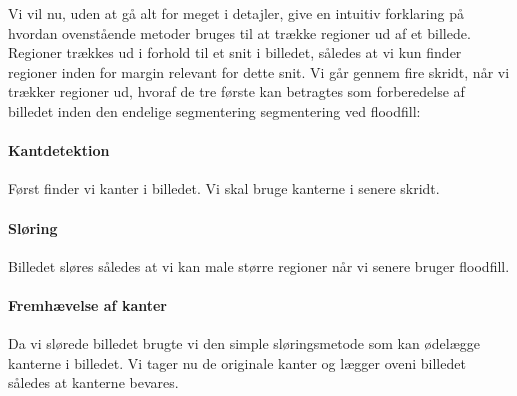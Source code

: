 {

Vi vil nu, uden at gå alt for meget i detajler, give en intuitiv
forklaring på hvordan ovenstående metoder bruges til at trække regioner
ud af et billede.  Regioner trækkes ud i forhold til et snit i billedet,
således at vi kun finder regioner inden for margin relevant for dette
snit. Vi går gennem fire skridt, når vi trækker regioner ud, hvoraf de
tre første kan betragtes som forberedelse af billedet inden den endelige
segmentering segmentering ved floodfill:

\paragraph{Kantdetektion}
Først finder vi kanter i billedet. Vi skal bruge kanterne i senere
skridt.

\begin{figure}[!h]
    \setlength\fboxsep{0pt}
    \setlength\fboxrule{0.5pt}
    \begin{center}
    \end{center}
    \caption[]{}
    \label{sammen_kanter}
\end{figure}

\paragraph{Sløring}
Billedet sløres således at vi kan male større regioner når vi senere
bruger floodfill.

\begin{figure}[!h]
    \setlength\fboxsep{0pt}
    \setlength\fboxrule{0.5pt}
    \begin{center}
    \end{center}
    \caption[]{}
    \label{sammen_slør}
\end{figure}

\paragraph{Fremhævelse af kanter}
Da vi slørede billedet brugte vi den simple sløringsmetode som kan
ødelægge kanterne i billedet. Vi tager nu de originale kanter og lægger
oveni billedet således at kanterne bevares.

\begin{figure}[!h]
    \setlength\fboxsep{0pt}
    \setlength\fboxrule{0.5pt}
    \begin{center}
    \end{center}
    \caption[]{}
    \label{sammen_frem_kant}
\end{figure}

}
